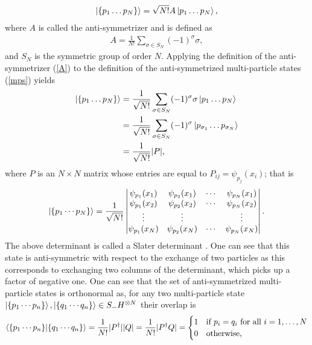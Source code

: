 \documentclass[Dual]{msu-thesis}
\begin{document}
\begin{align}
\label{mps}
\ket{\{p_1\ldots p_N\}}=\sqrt{N!}A\ket{p_1\ldots p_N},
\end{align}
where $A$ is called the anti-symmetrizer and is defined as
\begin{align}
\label{A}
A = \frac{1}{N!}\sum_{\sigma\in S_N}(-1)^\sigma \sigma,
\end{align}
and $S_N$ is the symmetric group of order $N$. Applying the definition of the anti-symmetrizer (\ref{A}) to the definition of the anti-symmetrized multi-particle states (\ref{mps}) yields
\begin{align}
\ket{\{p_1\ldots p_N\}}
&=\frac{1}{\sqrt{N!}}\sum_{\sigma\in S_N}(-1)^\sigma \sigma\ket{p_1\ldots p_N} \\
&=\frac{1}{\sqrt{N!}}\sum_{\sigma\in S_N}(-1)^\sigma\ket*{p_{{\sigma_1}}\ldots p_{{\sigma_N}}} \\
&=\frac{1}{\sqrt{N!}}|P|,
\end{align}
where $P$ is an $N\times N$ matrix whose entries are equal to $P_{ij}=\psi_{p_j}(x_i)$; that is
\begin{align}
\ket{\{p_1\cdots p_N\}}
=
\frac{1}{\sqrt{N!}}
\begin{vmatrix}
\psi_{p_1}(x_1) & \psi_{p_2}(x_1) & \cdots & \psi_{p_N}(x_1) \\
\psi_{p_1}(x_2) & \psi_{p_2}(x_2) & \cdots & \psi_{p_N}(x_2) \\
\vdots & \vdots &  & \vdots \\
\psi_{p_1}(x_N) & \psi_{p_2}(x_N) & \cdots & \psi_{p_N}(x_N) \\
\end{vmatrix}.
\end{align}
The above determinant is called a Slater determinant \cite{slater}. One can see that this state is anti-symmetric with respect to the exchange of two particles as this corresponds to exchanging two columns of the determinant, which picks up a factor of negative one. One can see that the set of anti-symmetrized multi-particle states is orthonormal as, for any two multi-particle state $\ket{\{p_1\cdots p_n\}},\ket{\{q_1\cdots q_n\}}\in S_-H^{\otimes N}$ their overlap is
\begin{align}
\bra{\{p_1\cdots p_n\}}\ket{\{q_1\cdots q_n\}}=\frac{1}{N!}|P^{\dagger}||Q|=\frac{1}{N!}|P^{\dagger}Q|=
\begin{cases}
1 & \text{if} \ p_i=q_i \ \text{for all} \ i=1,\ldots ,N \\
0 & \text{otherwise},
\end{cases}
\end{align}
\end{document}
